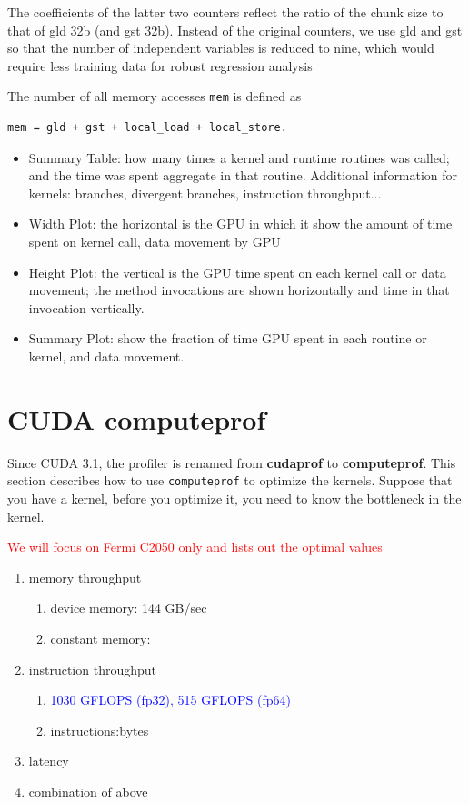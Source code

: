 The coefficients of the latter two counters reflect the ratio of the
chunk size to that of gld 32b (and gst 32b). Instead of the original
counters, we use gld and gst so that the number of independent
variables is reduced to nine, which would require less training data
for robust regression analysis

The number of all memory accesses \verb!mem! is defined as
\begin{verbatim}
mem = gld + gst + local_load + local_store.
\end{verbatim}

\begin{itemize}
\item Summary Table: how many times a kernel and runtime routines was
  called; and the time was spent aggregate in that routine. Additional
  information for kernels: branches, divergent branches, instruction
  throughput...

\item Width Plot: the horizontal is the GPU in which it show the
  amount of time spent on kernel call, data movement by GPU

\item Height Plot: the vertical is the GPU time spent on each kernel
  call or data movement; the method invocations are shown horizontally
  and time in that invocation vertically.

\item Summary Plot: show the fraction of time GPU spent in each
  routine or kernel, and data movement. 
\end{itemize}


\section{CUDA {\bf computeprof}}
\label{sec:cuda-computeprof}


Since CUDA 3.1, the profiler is renamed from {\bf cudaprof} to
{\bf computeprof}. This section describes how to use
\verb!computeprof! to optimize the kernels. Suppose that you have a
kernel, before you optimize it, you need to know the bottleneck in the
kernel.

\textcolor{red}{We will focus on Fermi C2050 only and lists out the
  optimal values}
\begin{enumerate}
\item memory throughput
  \begin{enumerate}
  \item device memory: 144 GB/sec
  \item constant memory: 
  \end{enumerate}
\item instruction throughput
  \begin{enumerate}
  \item \textcolor{blue}{ 1030 GFLOPS (fp32), 515 GFLOPS (fp64)}
  \item instructions:bytes
  \end{enumerate}
\item latency
\item combination of above
\end{enumerate}

